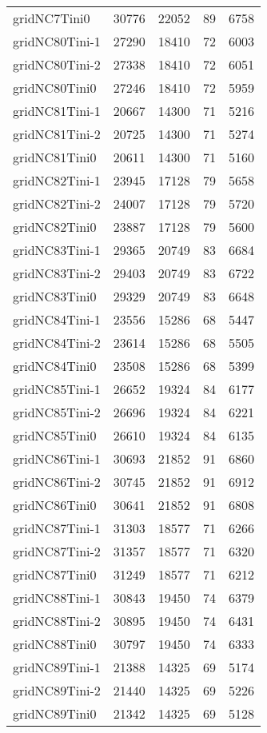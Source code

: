 \begin{longtable}{lrrrr}
gridNC7Tini0 & 30776 & 22052 & 89 & 6758 \\
gridNC80Tini-1 & 27290 & 18410 & 72 & 6003 \\
gridNC80Tini-2 & 27338 & 18410 & 72 & 6051 \\
gridNC80Tini0 & 27246 & 18410 & 72 & 5959 \\
gridNC81Tini-1 & 20667 & 14300 & 71 & 5216 \\
gridNC81Tini-2 & 20725 & 14300 & 71 & 5274 \\
gridNC81Tini0 & 20611 & 14300 & 71 & 5160 \\
gridNC82Tini-1 & 23945 & 17128 & 79 & 5658 \\
gridNC82Tini-2 & 24007 & 17128 & 79 & 5720 \\
gridNC82Tini0 & 23887 & 17128 & 79 & 5600 \\
gridNC83Tini-1 & 29365 & 20749 & 83 & 6684 \\
gridNC83Tini-2 & 29403 & 20749 & 83 & 6722 \\
gridNC83Tini0 & 29329 & 20749 & 83 & 6648 \\
gridNC84Tini-1 & 23556 & 15286 & 68 & 5447 \\
gridNC84Tini-2 & 23614 & 15286 & 68 & 5505 \\
gridNC84Tini0 & 23508 & 15286 & 68 & 5399 \\
gridNC85Tini-1 & 26652 & 19324 & 84 & 6177 \\
gridNC85Tini-2 & 26696 & 19324 & 84 & 6221 \\
gridNC85Tini0 & 26610 & 19324 & 84 & 6135 \\
gridNC86Tini-1 & 30693 & 21852 & 91 & 6860 \\
gridNC86Tini-2 & 30745 & 21852 & 91 & 6912 \\
gridNC86Tini0 & 30641 & 21852 & 91 & 6808 \\
gridNC87Tini-1 & 31303 & 18577 & 71 & 6266 \\
gridNC87Tini-2 & 31357 & 18577 & 71 & 6320 \\
gridNC87Tini0 & 31249 & 18577 & 71 & 6212 \\
gridNC88Tini-1 & 30843 & 19450 & 74 & 6379 \\
gridNC88Tini-2 & 30895 & 19450 & 74 & 6431 \\
gridNC88Tini0 & 30797 & 19450 & 74 & 6333 \\
gridNC89Tini-1 & 21388 & 14325 & 69 & 5174 \\
gridNC89Tini-2 & 21440 & 14325 & 69 & 5226 \\
gridNC89Tini0 & 21342 & 14325 & 69 & 5128 \\

\end{longtable}
